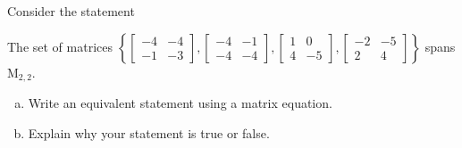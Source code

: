 
\begin{exerciseStatement}


Consider the statement 
\begin{center}\begin{minipage}{0.8\textwidth}
 The set of matrices \( \left\{ \left[\begin{array}{cc}
-4 & -4 \\
-1 & -3
\end{array}\right] , \left[\begin{array}{cc}
-4 & -1 \\
-4 & -4
\end{array}\right] , \left[\begin{array}{cc}
1 & 0 \\
4 & -5
\end{array}\right] , \left[\begin{array}{cc}
-2 & -5 \\
2 & 4
\end{array}\right] \right\} \) spans \(\mathrm{M}_{2,2}\). 
\end{minipage}\end{center}
    


\begin{enumerate}[(a)]
\item  Write an equivalent statement using a matrix equation.
\item  Explain why your statement is true or false.
\end{enumerate}
    
\end{exerciseStatement}
    
